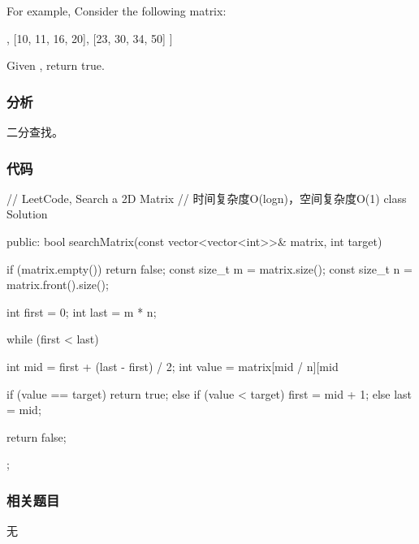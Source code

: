 For example, Consider the following matrix:
\begin{Code}
	[
	[1,   3,  5,  7],
	[10, 11, 16, 20],
	[23, 30, 34, 50]
	]
\end{Code}
Given , return true.


\subsubsection{分析}
二分查找。


\subsubsection{代码}
\begin{Code}
	// LeetCode, Search a 2D Matrix
	// 时间复杂度O(logn)，空间复杂度O(1)
	class Solution {
		public:
		bool searchMatrix(const vector<vector<int>>& matrix, int target) {
			if (matrix.empty()) return false;
			const size_t  m = matrix.size();
			const size_t n = matrix.front().size();
			
			int first = 0;
			int last = m * n;
			
			while (first < last) {
				int mid = first + (last - first) / 2;
				int value = matrix[mid / n][mid %
				
				if (value == target)
				return true;
				else if (value < target)
				first = mid + 1;
				else
				last = mid;
			}
			
			return false;
		}
	};
\end{Code}


\subsubsection{相关题目}
\begindot
\item 无
\myenddot
